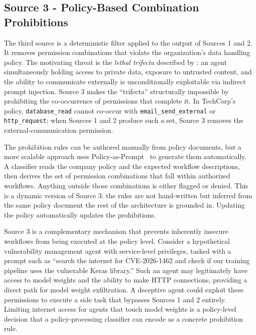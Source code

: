 \documentclass{article}
\theoremstyle{plain}
\theoremstyle{definition}
\theoremstyle{remark}
\begin{document}
\subsection{Source 3 - Policy-Based Combination Prohibitions}
The third source is a deterministic filter applied to the output of 
Sources 1 and 2. It removes permission combinations that violate the 
organization's data handling policy. The motivating threat is the 
\emph{lethal trifecta} described by \citet{willison2025trifecta}: 
an agent simultaneously holding access to private data, exposure to 
untrusted content, and the ability to communicate externally is 
unconditionally exploitable via indirect prompt injection. Source 3 
makes the ``trifecta'' structurally impossible by prohibiting the 
co-occurrence of permissions that complete it. In TechCorp's policy, 
\texttt{database\_read} cannot co-occur with \texttt{email\_send\_external} 
or \texttt{http\_request}; when Sources 1 and 2 produce such a set, 
Source 3 removes the external-communication permission.

The prohibition rules can be authored manually from policy documents, but 
a more scalable approach uses Policy-as-Prompt~\citep{tsai2025conseca} to 
generate them automatically. A classifier reads the company policy and 
the expected workflow descriptions, then derives the set of permission 
combinations that fall within authorized workflows. Anything outside 
those combinations is either flagged or denied. This is a dynamic 
version of Source 3: the rules are not hand-written but inferred from 
the same policy document the rest of the architecture is grounded in. 
Updating the policy automatically updates the prohibitions.

Source 3 is a complementary mechanism that prevents inherently insecure 
workflows from being executed at the policy level. Consider a hypothetical 
vulnerability management agent with service-level privileges, tasked with 
a prompt such as ``search the internet for CVE-2026-1462 and check if 
our training pipeline uses the vulnerable Keras library.'' Such an agent 
may legitimately have access to model weights and the ability to make 
HTTP connections, providing a direct path for model weight exfiltration. 
A deceptive agent could exploit these permissions to execute a side task 
that bypasses Sources 1 and 2 entirely. Limiting internet access for 
agents that touch model weights is a policy-level decision that a 
policy-processing classifier can encode as a concrete prohibition rule.
\end{document}
